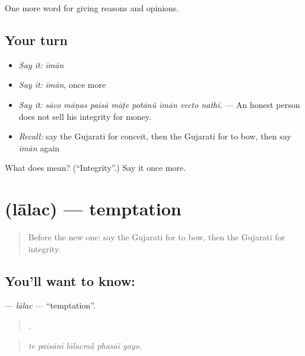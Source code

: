 \begin{grammarlens}[title={What you've built}]
One more word for giving reasons and opinions.
\end{grammarlens}

\subsection*{Your turn}
\begin{itemize}
\raggedright
  \item \emph{Say it:} \emph{īmān}
  \item \emph{Say it:} \emph{īmān}, once more
  \item \emph{Say it:} \emph{sāco māṇas paisā māṭe potānũ īmān vecto nathī.} — An honest person does not sell his integrity for money.
  \item \emph{Recall:} say the Gujarati for conceit, then the Gujarati for to bow, then say \emph{īmān} again
\end{itemize}

\begin{tcolorbox}[breakable,colback=teal!4,colframe=teal!35!black,title={Before you move on}]
What does  mean? (\textquotedblleft{}Integrity\textquotedblright{}.) Say it once more.
\end{tcolorbox}
\section[\texorpdfstring{\gu{લાલચ} (lālac)}{લાલચ (lālac)}]{ (lālac) — temptation}

\label{lesson:GU-C360-lalac}



\begin{quote}
Before the new one: say the Gujarati for to bow, then the Gujarati for integrity.
\end{quote}

\subsection*{You'll want to know: }
\textbf{} — \emph{lālac} — \textquotedblleft{}temptation\textquotedblright{}.

\begin{quote}
    .
\end{quote}

\begin{quote}
\emph{te paisānī lālacmā̃ phasāī gayo.}
\end{quote}

